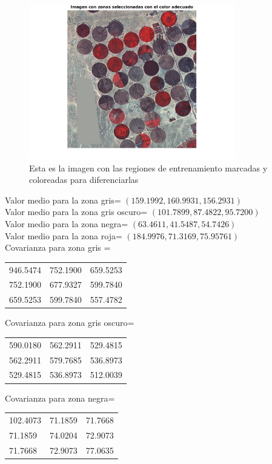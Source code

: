 \documentclass[a4paper,10pt]{article}
\begin{document}
\begin{figure}[H]
\centering
\includegraphics[width=90mm]{imagenColores.jpg}
\caption{Esta es la imagen con las regiones de entrenamiento marcadas y coloreadas para diferenciarlas}
\end{figure}

Valor medio para la zona gris= $(159.1992 , 160.9931 , 156.2931)$\\

Valor medio para la zona gris oscuro= $(101.7899 , 87.4822 , 95.7200)$\\

Valor medio para la zona negra= $(63.4611 , 41.5487 , 54.7426)$\\

Valor medio para la zona roja= $(184.9976 , 71.3169 , 75.95761)$\\

Covarianza para zona gris =
\begin{tabular}{ l c r }
  946.5474 & 752.1900 & 659.5253\\
  752.1900  &677.9327 & 599.7840\\
  659.5253  &599.7840 & 557.4782\\
\end{tabular}\newline

Covarianza para zona gris oscuro=
\begin{tabular}{ l c r }
  590.0180&  562.2911  &529.4815\\
  562.2911 & 579.7685 & 536.8973\\
  529.4815  &536.8973&  512.0039\\
\end{tabular}\newline

Covarianza para zona negra=
\begin{tabular}{ l c r }
  102.4073&   71.1859  & 71.7668\\
   71.1859 &  74.0204 &  72.9073\\
   71.7668  & 72.9073&   77.0635\\
\end{tabular}\newline
\end{document}
